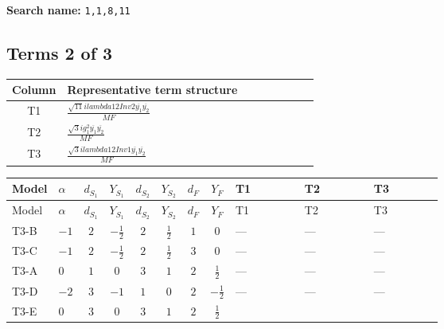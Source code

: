 \documentclass[8pt]{article}
\begin{document}
\begin{landscape}
\begin{longtable}{@{}llcccccc >{\raggedright\arraybackslash}p{0.21\linewidth} >{\raggedright\arraybackslash}p{0.21\linewidth} >{\raggedright\arraybackslash}p{0.21\linewidth}@{}}
\midrule
\bottomrule
\end{longtable}
\clearpage
\noindent\textbf{Search name: }\texttt{1,1,8,11}\par\smallskip
\subsection*{Terms 2 of 3}
\begin{center}
\begin{tabular}{@{}c >{\raggedright\arraybackslash}p{0.82\linewidth}@{}}
\toprule
Column & Representative term structure \\
\midrule
T1 & \(\displaystyle \frac{\sqrt{11} i lambda12Inv2 \overline{y_{1}} \overline{y_{2}}}{MF}\) \\
\midrule
T2 & \(\displaystyle \frac{\sqrt{3} i g_{1}^{2} \overline{y_{1}} \overline{y_{2}}}{MF}\) \\
\midrule
T3 & \(\displaystyle \frac{\sqrt{3} i lambda12Inv1 \overline{y_{1}} \overline{y_{2}}}{MF}\) \\
\midrule
\bottomrule
\end{tabular}
\end{center}
\smallskip
\tiny
\begin{longtable}{@{}llcccccc >{\raggedright\arraybackslash}p{0.21\linewidth} >{\raggedright\arraybackslash}p{0.21\linewidth} >{\raggedright\arraybackslash}p{0.21\linewidth}@{}}
\toprule
Model & $\alpha$ & $d_{S_1}$ & $Y_{S_1}$ & $d_{S_2}$ & $Y_{S_2}$ & $d_F$ & $Y_F$ & T1 & T2 & T3 \\
\midrule
\endfirsthead
\toprule
Model & $\alpha$ & $d_{S_1}$ & $Y_{S_1}$ & $d_{S_2}$ & $Y_{S_2}$ & $d_F$ & $Y_F$ & T1 & T2 & T3 \\
\midrule
\endhead
T3-B & $-1$ & $2$ & $-\frac{1}{2}$ & $2$ & $\frac{1}{2}$ & $1$ & $0$ & --- & --- & --- \\
\midrule
T3-C & $-1$ & $2$ & $-\frac{1}{2}$ & $2$ & $\frac{1}{2}$ & $3$ & $0$ & --- & --- & --- \\
\midrule
T3-A & $0$ & $1$ & $0$ & $3$ & $1$ & $2$ & $\frac{1}{2}$ & --- & --- & --- \\
\midrule
T3-D & $-2$ & $3$ & $-1$ & $1$ & $0$ & $2$ & $-\frac{1}{2}$ & --- & --- & --- \\
\midrule
T3-E & $0$ & $3$ & $0$ & $3$ & $1$ & $2$ & $\frac{1}{2}$ & \scriptsize\adjustbox{max width=\linewidth}{$\begin{gathered} - \frac{3 \sqrt{11} i lambda12Inv2 \overline{y_{1}} \overline{y_{2}}}{22 MF}\end{gathered}$} & \scriptsize\adjustbox{max width=\linewidth}{$\begin{gathered} - \frac{\sqrt{3} i g_{1}^{2} \overline{y_{1}} \overline{y_{2}}}{8 MF}\end{gathered}$} & \scriptsize\adjustbox{max width=\linewidth}{$\begin{gathered} \frac{\sqrt{3} i lambda12Inv1 \overline{y_{1}} \overline{y_{2}}}{6 MF}\end{gathered}$} \\

\end{longtable}
\end{landscape}
\end{document}
